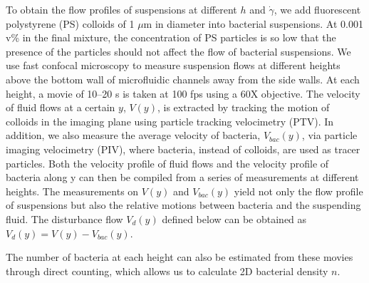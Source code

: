 To obtain the flow profiles of suspensions at different $h$ and $\dot\gamma$, we add fluorescent polystyrene (PS) colloids of 1 $\mu$m in diameter into bacterial suspensions. At 0.001 v\% in the final mixture, the concentration of PS particles is so low that the presence of the particles should not affect the flow of bacterial suspensions. We use fast confocal microscopy to measure suspension flows at different heights above the bottom wall of microfluidic channels away from the side walls. At each height, a movie of 10–20 s is taken at 100 fps using a 60X objective. The velocity of fluid flows at a certain $y$, $V(y)$, is extracted by tracking the motion of colloids in the imaging plane using particle tracking velocimetry (PTV). In addition, we also measure the average velocity of bacteria, $V_{bac}(y)$, via particle imaging velocimetry (PIV), where bacteria, instead of colloids, are used as tracer particles. Both the velocity profile of fluid flows and the velocity profile of bacteria along y can then be compiled from a series of measurements at different heights. The measurements on $V(y)$ and $V_{bac}(y)$ yield not only the flow profile of suspensions but also the relative motions between bacteria and the suspending fluid. The disturbance flow $V_d(y)$ defined below can be obtained as $V_d(y) = V(y) - V_{bac}(y)$.

The number of bacteria at each height can also be estimated from these movies through direct counting, which allows us to calculate 2D bacterial density $n$.

